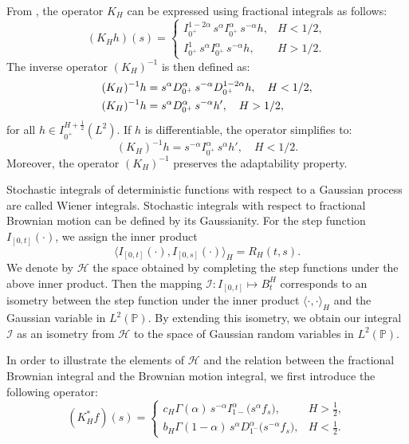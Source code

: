 \documentclass[preprint,12pt]{elsarticle}
\theoremstyle{definition}  %
\theoremstyle{plain}  %
\begin{document}
   
 From \cite[Lemma 10]{Nualart}, the operator \( K_H \) can be expressed using fractional integrals as follows:   
\[
(K_H h)(s) = \begin{cases}
\displaystyle
I^{1-2\alpha}_{0^+} \, s^{\alpha} I^{\alpha}_{0^+} \, s^{-\alpha} h, & H <1/2, \\
\displaystyle
I^{1}_{0^+} \, s^{\alpha} I^{\alpha}_{0^+} \, s^{-\alpha} h, & H >1/2.
\end{cases}
\]  
 The inverse operator \((K_H)^{-1}\) is then defined as:  
\begin{align}  
\notag (K_H)^{-1} h &= s^{\alpha} D^{\alpha}_{0^+} \, s^{-\alpha} D^{1-2\alpha}_{0^+} h, \quad H < 1/2, \\  
(K_H)^{-1} h &= s^{\alpha} D^{\alpha}_{0^+} \, s^{-\alpha} h', \quad H > 1/2,\label{g1/2}   
\end{align}    
for all \(h \in I^{H+\frac{1}{2}}_{0^+}(L^2)\). If \(h\) is differentiable, the operator simplifies to:  
\begin{equation} \label{l1/2}  
(K_H)^{-1} h = s^{-\alpha} I^{\alpha}_{0^+} \, s^{\alpha} h', \quad H <1/2.  
\end{equation}  
Moreover, the operator \((K_H)^{-1}\) preserves the adaptability property.

Stochastic integrals of deterministic functions with respect to a Gaussian process are called Wiener integrals.  Stochastic integrals with respect to fractional Brownian motion can be defined by  its Gaussianity. For the step function $I_{[0,t]}(\cdot)$, we assign the inner product 
\[
\langle I_{[0,t]}(\cdot), I_{[0,s]}(\cdot) \rangle_H = R_H(t,s).
\]
We denote by $\mathcal{H}$ the space obtained by completing the step functions under the above inner product.
Then the mapping $\mathcal{I}:I_{[0,t]}\longmapsto B^H_t$ corresponds to an isometry between the step function under the inner product $\langle  \cdot, \cdot \rangle_H $ and the Gaussian variable in $L^2(\mathbb{P})$. By extending this isometry, we obtain our integral $\mathcal{I}$ as an isometry from $\mathcal{H}$ to the space of Gaussian random variables in $L^2(\mathbb{P})$.


In order to illustrate the elements of $\mathcal{H}$ and the relation between the fractional Brownian  integral and the Brownian motion integral, we first introduce the following operator:
\[
  (K_H^*f)(s)=
  \begin{cases}
    c_H\Gamma(\alpha)\, s^{-\alpha}I_{1-}^\alpha\big(s^\alpha f_s\big), & H>\tfrac{1}{2}, \\[1ex]
    b_H\Gamma(1-\alpha)\, s^\alpha D^\alpha_{1^-}\big(s^{-\alpha}f_s\big), & H<\tfrac{1}{2}.
  \end{cases}
\]
\end{document}
